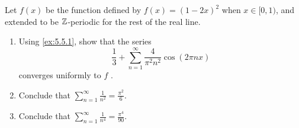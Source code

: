 \begin{ex}\label{ex:5.5.2}
  Let \(f(x)\) be the function defined by \(f(x) = (1 - 2x)^2\) when \(x \in [0, 1)\), and extended to be \(\mathbb{Z}\)-periodic for the rest of the real line.
  \begin{enumerate}
    \item Using \cref{ex:5.5.1}, show that the series
          \[
            \frac{1}{3} + \sum_{n = 1}^\infty \frac{4}{\pi^2 n^2} \cos(2 \pi n x)
          \]
          converges uniformly to \(f\) .
    \item Conclude that \(\sum_{n = 1}^\infty \frac{1}{n^2} = \frac{\pi^2}{6}\).
    \item Conclude that \(\sum_{n = 1}^\infty \frac{1}{n^4} = \frac{\pi^4}{90}\).
  \end{enumerate}
\end{ex}

